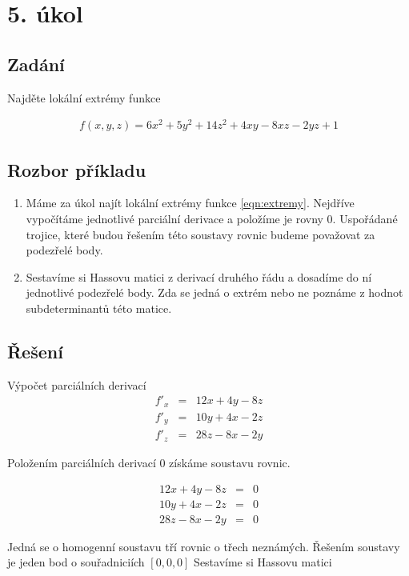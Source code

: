 \section{5. úkol}
\subsection*{Zadání}
Najděte lokální extrémy funkce 

\begin{eqnarray}
f(x,y,z) = 6x^2 + 5y^2 + 14z^2 + 4xy - 8xz - 2yz +1
\label{eqn:extremy}
\end{eqnarray}

\subsection*{Rozbor příkladu}
\begin{enumerate}
	\item Máme za úkol najít lokální extrémy funkce \ref{eqn:extremy}. Nejdříve vypočítáme jednotlivé parciální derivace a položíme je rovny $0$. Uspořádané trojice, které budou řešením této soustavy rovnic budeme považovat za podezřelé body.

	\item Sestavíme si Hassovu matici z derivací druhého řádu a dosadíme do ní jednotlivé podezřelé body. Zda se jedná o extrém nebo ne poznáme z hodnot subdeterminantů této matice.
\end{enumerate}

\subsection*{Řešení}
Výpočet parciálních derivací
\begin{eqnarray}
f'_x  & = & 12x + 4y - 8z \nonumber \\
f'_y  & = & 10y + 4x - 2z \nonumber \\
f'_z  & = & 28z - 8x - 2y \nonumber
\end{eqnarray}

\noindent Položením parciálních derivací $0$ získáme soustavu rovnic. 

\begin{eqnarray}
12x + 4y - 8z & = & 0\nonumber \\
10y + 4x - 2z & = & 0\nonumber \\
28z - 8x - 2y & = & 0\nonumber
\end{eqnarray}

Jedná se o homogenní soustavu tří rovnic o třech neznámých. Řešením soustavy je jeden bod o souřadniciích $[0,0,0]$ Sestavíme si Hassovu matici

